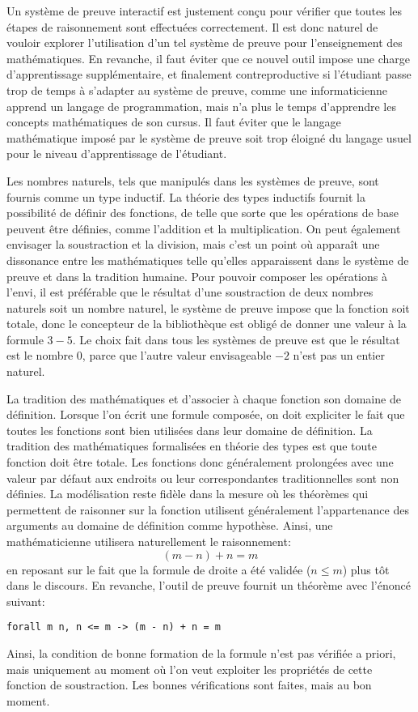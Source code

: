 \documentclass[draft]{jflart}
\begin{document}
Un système de preuve interactif est justement conçu pour vérifier que toutes
les étapes de raisonnement sont effectuées correctement.  Il est donc
naturel de vouloir explorer l'utilisation d'un tel système de preuve
pour l'enseignement des mathématiques.  En revanche, il faut éviter
que ce nouvel outil impose une charge d'apprentissage supplémentaire,
et finalement contreproductive si l'étudiant passe trop de temps à
s'adapter au système de preuve, comme une informaticienne apprend un
langage de programmation, mais n'a plus le temps d'apprendre les
concepts mathématiques de son cursus.  Il faut éviter que le langage
mathématique imposé par le système de preuve soit trop éloigné du
langage usuel pour le niveau d'apprentissage de l'étudiant.

Les nombres naturels, tels que manipulés dans les systèmes de preuve,
sont fournis comme un type inductif.  La théorie des types inductifs
fournit la possibilité de définir des fonctions, de telle que sorte
que les opérations de base peuvent être définies, comme l'addition et
la multiplication.  On peut également envisager la soustraction et la
division, mais c'est un point où apparaît une dissonance entre les
mathématiques telle qu'elles apparaissent dans le système de preuve et
dans la tradition humaine.  Pour pouvoir composer les opérations à
l'envi, il est préférable que le résultat d'une soustraction de deux
nombres naturels soit un nombre naturel, le système de preuve impose
que la fonction soit totale, donc le concepteur de la bibliothèque est
obligé de donner une valeur à la formule \(3 - 5\).  Le choix fait
dans tous les systèmes de preuve est que le résultat est le nombre
\(0\), parce que l'autre valeur envisageable \(-2\) n'est pas un
entier naturel.

La tradition des mathématiques et d'associer à chaque fonction son
domaine de définition.  Lorsque l'on écrit une formule composée, on
doit expliciter le fait que toutes les fonctions sont bien utilisées
dans leur domaine de définition.  La tradition des mathématiques
formalisées en théorie des types est que toute fonction doit être
totale.  Les fonctions donc généralement prolongées avec une valeur
par défaut aux endroits ou leur correspondantes traditionnelles sont
non définies.  La modélisation reste fidèle dans la mesure où les
théorèmes qui permettent de raisonner sur la fonction utilisent
généralement l'appartenance des arguments au domaine de définition
comme hypothèse.  Ainsi, une mathématicienne utilisera naturellement
le raisonnement:
\[(m - n) + n = m\]
en reposant sur le fait que la formule de droite a été validée (\(n
\leq m\)) plus tôt dans le discours.  En revanche, l'outil de preuve
fournit un théorème avec l'énoncé suivant:
\begin{verbatim}
forall m n, n <= m -> (m - n) + n = m
\end{verbatim}
Ainsi, la condition de bonne formation de la formule n'est pas
vérifiée a priori, mais uniquement au moment où l'on veut exploiter
les propriétés de cette fonction de soustraction.  Les bonnes
vérifications sont faites, mais au bon moment.
\end{document}
